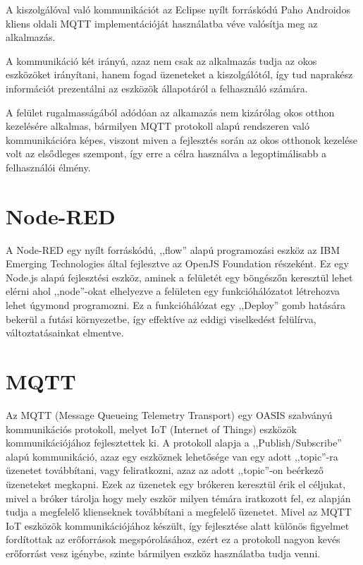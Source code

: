 \documentclass[
]{thesis-ekf}
\theoremstyle{definition}
\theoremstyle{remark}
\begin{document}
A kiszolgálóval való kommunikációt az Eclipse nyílt forráskódú Paho\cite{paho} Androidos kliens oldali MQTT implementációját használatba véve valósítja meg az alkalmazás. 

A kommunikáció két irányú, azaz nem csak az alkalmazás tudja az okos eszközöket irányítani, 
hanem fogad üzeneteket a kiszolgálótól, így tud naprakész információt prezentálni az eszközök állapotáról a felhasználó számára.

A felület rugalmasságából adódóan az alkamazás nem kizárólag okos otthon kezelésére alkalmas, bármilyen MQTT protokoll alapú rendszeren való kommunikációra képes,
viszont miven a fejlesztés során az okos otthonok kezelése volt az elsődleges szempont, így erre a célra használva a legoptimálisabb a felhasználói élmény.

\section{Node-RED}
A Node-RED egy nyílt forráskódú, ,,flow'' alapú programozási eszköz az IBM Emerging Technologies\cite{ibmET} által fejlesztve az OpenJS Foundation\cite{openjs} részeként. 
Ez egy Node.js alapú fejlesztési eszköz, aminek a felületét egy böngészőn keresztül lehet elérni ahol ,,node''-okat elhelyezve a felületen  egy funkcióhálózatot létrehozva lehet úgymond programozni. 
Ez a funkcióhálózat egy ,,Deploy'' gomb hatására bekerül a futási környezetbe, így effektíve az eddigi viselkedést felülírva, változtatásainkat elmentve.

\section{MQTT}
Az MQTT (Message Queueing Telemetry Transport)\cite{mqtt} egy OASIS szabványú kommunikációs protokoll, 
melyet IoT (Internet of Things) eszközök kommunikációjához fejlesztettek ki. 
A protokoll alapja a ,,Publish/Subscribe'' alapú kommunikáció, azaz egy eszköznek lehetősége van egy adott ,,topic''-ra üzenetet továbbítani, 
vagy feliratkozni, azaz az adott ,,topic''-on beérkező üzeneteket megkapni. Ezek az üzenetek egy brókeren keresztül érik el céljukat, 
mivel a bróker tárolja hogy mely eszkör milyen témára iratkozott fel, ez alapján tudja a megfelelő klienseknek továbbítani a megfelelő üzenetet. 
Mivel az MQTT IoT eszközök kommunikációjához készült, így fejlesztése alatt különös figyelmet fordítottak az erőforrások megspórolásához, 
ezért ez a protokoll nagyon kevés erőforrást vesz igénybe, szinte bármilyen eszköz használatba tudja venni.
\end{document}
